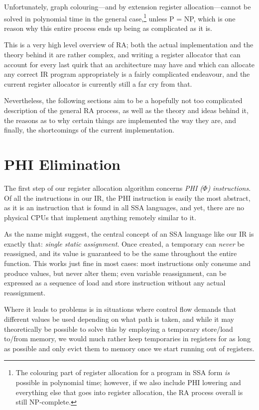 \documentclass[12pt]{report}
\begin{document}
Unfortunately, graph colouring—and by extension register allocation—cannot be solved in polynomial time in the general
case,\footnote{The colouring part of register allocation for a program in SSA form \textit{is} possible in polynomial time; however, if we
also include PHI lowering and everything else that goes into register allocation, the RA process overall is still NP-complete.} unless
P = NP, which is one reason why this entire process ends up being as complicated as it is.

This is a very high level overview of RA; both the actual implementation and the theory behind it are rather complex, and writing a register
allocator that can account for every last quirk that an architecture may have and which can allocate any correct IR program appropriately
is a fairly complicated endeavour, and the current register allocator is currently still a far cry from that.

Nevertheless, the following sections aim to be a hopefully not too complicated description of the general RA process, as well as the theory
and ideas behind it, the reasons as to why certain things are implemented the way they are, and finally, the shortcomings of the current
implementation.

\section{PHI Elimination}
The first step of our register allocation algorithm concerns \textit{PHI ($\Phi$) instructions}. Of all the instructions in our IR, the PHI
instruction is easily the most abstract, as it is an instruction that is found in all SSA languages, and yet, there are no physical CPUs
that implement anything remotely similar to it.

As the name might suggest, the central concept of an SSA language like our IR is exactly that: \textit{single static assignment}. Once
created, a temporary can \textit{never} be reassigned, and its value is guaranteed to be the same throughout the entire function. This
works just fine in most cases: most instructions only consume and produce values, but never alter them; even variable reassignment,
can be expressed as a sequence of load and store instruction without any actual reassignment. 

Where it leads to problems is in situations where control flow demands that different values be used depending on what path is taken, 
and while it may theoretically be possible to solve this by employing a temporary store/load to/from memory, we would much rather keep
temporaries in registers for as long as possible and only evict them to memory once we start running out of registers.
\end{document}
